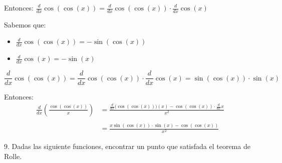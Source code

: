 \documentclass[12pt]{article}
\begin{document}
\begin{enumerate}[\hspace{9px} a)]
        Entonces: \quad \(\displaystyle\frac{d}{dx}\cos(\cos(x))=\frac{d}{dx}\cos(\cos(x))\cdot\frac{d}{dx}\cos(x)\)\medskip

        Sabemos que:
        \begin{itemize}
            \item \(\displaystyle\frac{d}{dx}\cos(\cos(x))=-\sin(\cos(x))\)
            \item \(\displaystyle\frac{d}{dx}\cos(x)=-\sin(x)\)
        \end{itemize}

        \begin{equation*}
            \displaystyle\frac{d}{dx}\cos(\cos(x))=\frac{d}{dx}\cos(\cos(x))\cdot\frac{d}{dx}\cos(x)=\sin(\cos(x))\cdot\sin(x)
        \end{equation*}

        Entonces:
        \begin{align*}
            \displaystyle\frac{d}{dx}\left(\frac{\cos(\cos(x))}{x}\right)&=\frac{\displaystyle\frac{d}{dx}\big(\cos(\cos(x))\big)(x)-\cos(\cos(x))\cdot\frac{d}{dx}x}{x^2}\\ \\
            &=\frac{x\sin(\cos(x))\cdot\sin(x)-\cos(\cos(x))}{x^2}
        \end{align*}

\end{enumerate}

9. Dadas las siguiente funciones, encontrar un punto que satisfada el teorema de Rolle.
\end{document}

